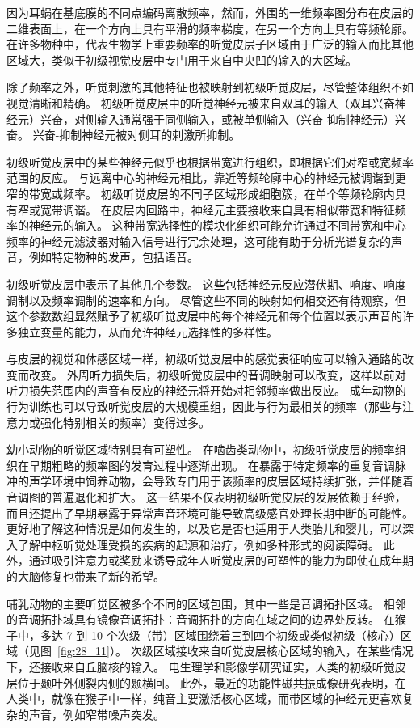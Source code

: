 因为耳蜗在基底膜的不同点编码离散频率，然而，外围的一维频率图分布在皮层的二维表面上，在一个方向上具有平滑的频率梯度，在另一个方向上具有等频轮廓。
在许多物种中，代表生物学上重要频率的听觉皮层子区域由于广泛的输入而比其他区域大，类似于初级视觉皮层中专门用于来自中央凹的输入的大区域。


除了频率之外，听觉刺激的其他特征也被映射到初级听觉皮层，尽管整体组织不如视觉清晰和精确。
初级听觉皮层中的听觉神经元被来自双耳的输入（双耳兴奋神经元）兴奋，对侧输入通常强于同侧输入，或被单侧输入（兴奋-抑制神经元）兴奋。
兴奋-抑制神经元被对侧耳的刺激所抑制。


初级听觉皮层中的某些神经元似乎也根据带宽进行组织，即根据它们对窄或宽频率范围的反应。
与远离中心的神经元相比，靠近等频轮廓中心的神经元被调谐到更窄的带宽或频率。
初级听觉皮层的不同子区域形成细胞簇，在单个等频轮廓内具有窄或宽带调谐。
在皮层内回路中，神经元主要接收来自具有相似带宽和特征频率的神经元的输入。
这种带宽选择性的模块化组织可能允许通过不同带宽和中心频率的神经元滤波器对输入信号进行冗余处理，这可能有助于分析光谱复杂的声音，例如特定物种的发声，包括语音。


初级听觉皮层中表示了其他几个参数。
这些包括神经元反应潜伏期、响度、响度调制以及频率调制的速率和方向。
尽管这些不同的映射如何相交还有待观察，但这个参数数组显然赋予了初级听觉皮层中的每个神经元和每个位置以表示声音的许多独立变量的能力，从而允许神经元选择性的多样性。


与皮层的视觉和体感区域一样，初级听觉皮层中的感觉表征响应可以输入通路的改变而改变。
外周听力损失后，初级听觉皮层中的音调映射可以改变，这样以前对听力损失范围内的声音有反应的神经元将开始对相邻频率做出反应。
成年动物的行为训练也可以导致听觉皮层的大规模重组，因此与行为最相关的频率（那些与注意力或强化特别相关的频率）变得过多\cite{zhang2001persistent,merzenich1975representation}。


幼小动物的听觉区域特别具有可塑性。
在啮齿类动物中，初级听觉皮层的频率组织在早期粗略的频率图的发育过程中逐渐出现。
在暴露于特定频率的重复音调脉冲的声学环境中饲养动物，会导致专门用于该频率的皮层区域持续扩张，并伴随着音调图的普遍退化和扩大。
这一结果不仅表明初级听觉皮层的发展依赖于经验，而且还提出了早期暴露于异常声音环境可能导致高级感官处理长期中断的可能性。
更好地了解这种情况是如何发生的，以及它是否也适用于人类胎儿和婴儿，可以深入了解中枢听觉处理受损的疾病的起源和治疗，例如多种形式的阅读障碍。
此外，通过吸引注意力或奖励来诱导成年人听觉皮层的可塑性的能力为即使在成年期的大脑修复也带来了新的希望。


哺乳动物的主要听觉区被多个不同的区域包围，其中一些是音调拓扑区域。
相邻的音调拓扑域具有镜像音调拓扑：音调拓扑的方向在域之间的边界处反转。
在猴子中，多达 7 到 10 个次级（带）区域围绕着三到四个初级或类似初级（核心）区域（见图~\ref{fig:28_11}）。
次级区域接收来自听觉皮层核心区域的输入，在某些情况下，还接收来自丘脑核的输入。
电生理学和影像学研究证实，人类的初级听觉皮层位于颞叶外侧裂内侧的颞横回。
此外，最近的功能性磁共振成像研究表明，在人类中，就像在猴子中一样，纯音主要激活核心区域，而带区域的神经元更喜欢复杂的声音，例如窄带噪声突发。



